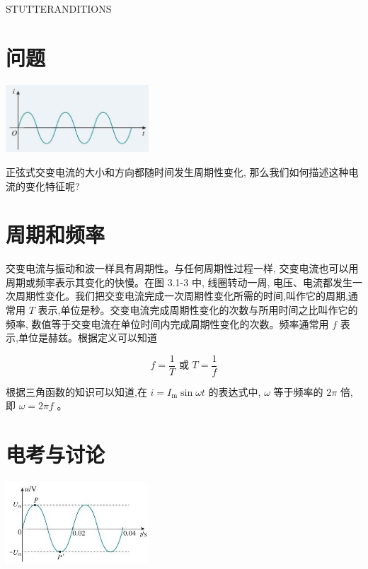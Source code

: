 \documentclass[10pt]{article}
\begin{document}
STUTTERANDITIONS

\section*{问题}

\begin{center}
\includegraphics[max width=0.4\textwidth]{images/01910e72-c5b7-7ed5-a6d4-fb3a5faefc32_59_269688.jpg}
\end{center}

正弦式交变电流的大小和方向都随时间发生周期性变化, 那么我们如何描述这种电流的变化特征呢?

\section*{周期和频率}

交变电流与振动和波一样具有周期性。与任何周期性过程一样, 交变电流也可以用周期或频率表示其变化的快慢。在图 3.1-3 中, 线圈转动一周, 电压、电流都发生一次周期性变化。我们把交变电流完成一次周期性变化所需的时间,叫作它的周期,通常用 \(T\) 表示,单位是秒。交变电流完成周期性变化的次数与所用时间之比叫作它的频率, 数值等于交变电流在单位时间内完成周期性变化的次数。频率通常用 \(f\) 表示,单位是赫兹。根据定义可以知道

\[
f = \frac{1}{T}\text{ 或 }T = \frac{1}{f}
\]

根据三角函数的知识可以知道,在 \(i = {I}_{\mathrm{m}}\sin {\omega t}\) 的表达式中, \(\omega\) 等于频率的 \({2\pi }\) 倍,即 \(\omega = {2\pi f}\) 。

\section*{电考与讨论}

\begin{center}
\includegraphics[max width=0.4\textwidth]{images/01910e72-c5b7-7ed5-a6d4-fb3a5faefc32_59_334667.jpg}
\end{center}
\end{document}
